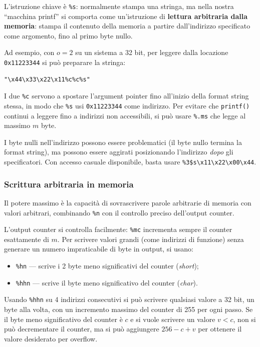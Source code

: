 \documentclass{article}
\begin{document}
L'istruzione chiave è \texttt{\%s}: normalmente stampa una stringa, ma nella nostra ``macchina printf'' si comporta come un'istruzione di \textbf{lettura arbitraria dalla memoria}: stampa il contenuto della memoria a partire dall'indirizzo specificato come argomento, fino al primo byte nullo.

Ad esempio, con $o = 2$ su un sistema a 32 bit, per leggere dalla locazione \texttt{0x11223344} si può preparare la stringa:
\begin{verbatim}
"\x44\x33\x22\x11%c%c%s"
\end{verbatim}
I due \texttt{\%c} servono a spostare l'argument pointer fino all'inizio della format string stessa, in modo che \texttt{\%s} usi \texttt{0x11223344} come indirizzo. Per evitare che \texttt{printf()} continui a leggere fino a indirizzi non accessibili, si può usare \texttt{\%.ms} che legge al massimo $m$ byte.

I byte nulli nell'indirizzo possono essere problematici (il byte nullo termina la format string), ma possono essere aggirati posizionando l'indirizzo \textit{dopo} gli specificatori. Con accesso casuale disponibile, basta usare \texttt{\%3\$s\textbackslash x11\textbackslash x22\textbackslash x00\textbackslash x44}.

\subsubsection*{Scrittura arbitraria in memoria}

Il potere massimo è la capacità di sovrascrivere parole arbitrarie di memoria con valori arbitrari, combinando \texttt{\%n} con il controllo preciso dell'output counter.

L'output counter si controlla facilmente: \texttt{\%mc} incrementa sempre il counter esattamente di $m$. Per scrivere valori grandi (come indirizzi di funzione) senza generare un numero impraticabile di byte in output, si usano:
\begin{itemize}
    \item \texttt{\%hn} --- scrive i 2 byte meno significativi del counter (\textit{short});
    \item \texttt{\%hhn} --- scrive il byte meno significativo del counter (\textit{char}).
\end{itemize}

Usando \texttt{\%hhn} su 4 indirizzi consecutivi si può scrivere qualsiasi valore a 32 bit, un byte alla volta, con un incremento massimo del counter di 255 per ogni passo. Se il byte meno significativo del counter è $c$ e si vuole scrivere un valore $v < c$, non si può decrementare il counter, ma si può aggiungere $256 - c + v$ per ottenere il valore desiderato per overflow.
\end{document}
